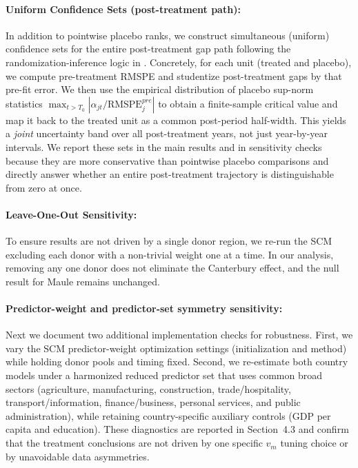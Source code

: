 \documentclass[12pt]{article}
\begin{document}
\paragraph{Uniform Confidence Sets (post-treatment path):} In addition to pointwise placebo ranks, we construct simultaneous (uniform) confidence sets for the entire post-treatment gap path following the randomization-inference logic in \textcite{firpo2018synthetic}. Concretely, for each unit (treated and placebo), we compute pre-treatment RMSPE and studentize post-treatment gaps by that pre-fit error. We then use the empirical distribution of placebo sup-norm statistics $\max_{t>T_0} |\alpha_{jt}/\text{RMSPE}^{pre}_j|$ to obtain a finite-sample critical value and map it back to the treated unit as a common post-period half-width. This yields a \emph{joint} uncertainty band over all post-treatment years, not just year-by-year intervals. We report these sets in the main results and in sensitivity checks because they are more conservative than pointwise placebo comparisons and directly answer whether an entire post-treatment trajectory is distinguishable from zero at once.

\paragraph{Leave-One-Out Sensitivity:} To ensure results are not driven by a single donor region, we re-run the SCM excluding each donor with a non-trivial weight one at a time. In our analysis, removing any one donor does not eliminate the Canterbury effect, and the null result for Maule remains unchanged.

\paragraph{Predictor-weight and predictor-set symmetry sensitivity:} Next we document two additional implementation checks for robustness. First, we vary the SCM predictor-weight optimization settings (initialization and method) while holding donor pools and timing fixed. Second, we re-estimate both country models under a harmonized reduced predictor set that uses common broad sectors (agriculture, manufacturing, construction, trade/hospitality, transport/information, finance/business, personal services, and public administration), while retaining country-specific auxiliary controls (GDP per capita and education). These diagnostics are reported in Section~4.3 and confirm that the treatment conclusions are not driven by one specific $v_m$ tuning choice or by unavoidable data asymmetries.
\end{document}
